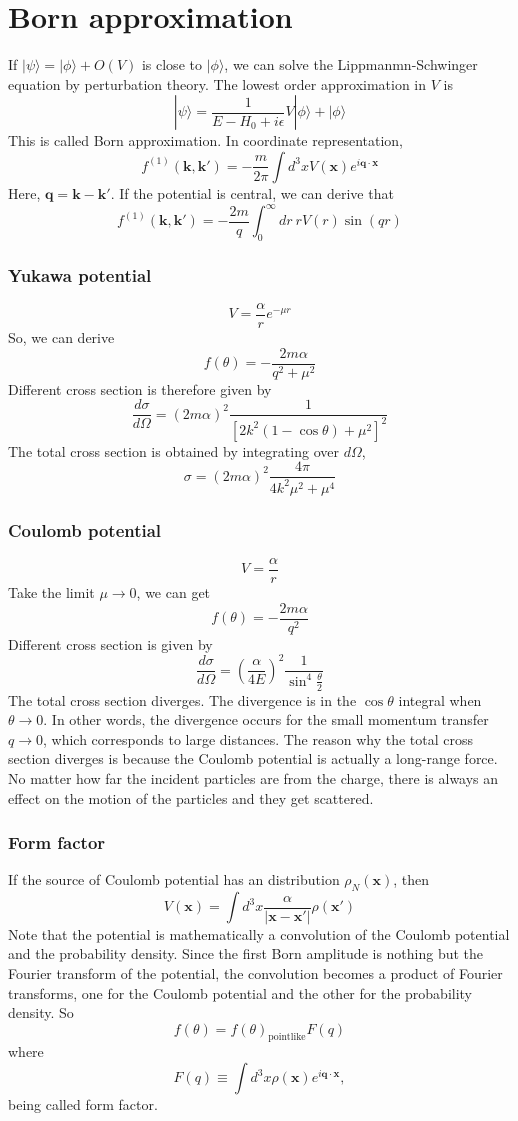 \section{Born approximation}
If $|\psi\rangle = |\phi\rangle + O(V)$ is close to $|\phi\rangle$, we can solve the Lippmanmn-Schwinger equation by perturbation theory. The lowest order approximation in $V$ is
\[|\psi\rangle = \frac{1}{E-H_0 + i\epsilon} V|\phi\rangle + |\phi\rangle\]
This is called Born approximation. In coordinate representation,
\[f^{(1)}(\bm{k},\bm{k}') = - \frac{m}{2\pi} \int d^3x V(\bm{x}) e^{i\bm{q}\cdot\bm{x}}\]
Here, $\bm{q} = \bm{k} - \bm{k}'$. If the potential is central, we can derive that
\[f^{(1)}(\bm{k},\bm{k}') = - \frac{2m}{q} \int_0^{\infty} dr \: r V(r) \sin(qr)\]

\subsubsection{Yukawa potential}
\[V = \frac{\alpha}{r}  e^{-\mu r}\]
So, we can derive
\[f(\theta) = - \frac{2m\alpha}{q^2 + \mu^2}\]
Different cross section is therefore given by
\[\frac{d\sigma}{d\Omega} = (2m\alpha)^2 \frac{1}{[2k^2(1-\cos\theta) + \mu^2]^2}\]
The total cross section is obtained by integrating over $d\Omega$,
\[\sigma = (2m\alpha)^2 \frac{4\pi}{4k^2\mu^2 + \mu^4}\]

\subsubsection{Coulomb potential}
\[V = \frac{\alpha}{r}\]
Take the limit $\mu \to 0$, we can get
\[f(\theta) = - \frac{2m\alpha}{q^2}\]
Different cross section is given by
\[\frac{d\sigma}{d\Omega} = (\frac{\alpha}{4E})^2 \frac{1}{\sin^4{\frac{\theta}{2}}}\]
The total cross section diverges. The divergence is in the $\cos\theta$ integral when $\theta \to 0$. In other words, the divergence occurs for the small momentum transfer $q \to 0$, which corresponds to large distances.
The reason why the total cross section diverges is because the Coulomb potential is actually a long-range force. No matter how far the incident particles are from the charge, there is always an effect on the motion of the particles and they get scattered.

\subsubsection{Form factor}
\noindent
If the source of Coulomb potential has an distribution $\rho_N(\bm{x})$, then
\[V(\bm{x}) = \int d^3x \frac{\alpha}{|\bm{x}-\bm{x}'|} \rho(\bm{x}')\]
Note that the potential is mathematically a convolution of the Coulomb potential and the probability density. Since the first Born amplitude is nothing but the Fourier transform of the potential, the convolution becomes a product of Fourier transforms, one for the Coulomb potential and the other for the probability density. So
\[f(\theta) = f(\theta)_{\mathrm{pointlike}} F(q)\]
where
\[F(q) \equiv \int d^3x \rho(\bm{x}) e^{i \bm{q} \cdot \bm{x}},\]
being called form factor.

